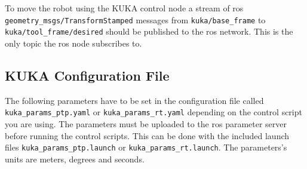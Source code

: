 \documentclass[headsepline,footinclude=false,fontsize=11pt,paper=a4,listof=totoc,bibliography=totoc,BCOR=12mm,DIV=14]{scrbook}
\begin{document}
To move the robot using the KUKA control node a stream of \gls{ros} \texttt{geometry\_msgs/TransformStamped} messages from \texttt{kuka/base\_frame} to \texttt{kuka/tool\_frame/desired} should be published to the \gls{ros} network. This is the only topic the \gls{ros} node subscribes to.

\newpage
\subsection{KUKA Configuration File}

The following parameters have to be set in the configuration file called \texttt{kuka\_params\_ptp.yaml} or \texttt{kuka\_params\_rt.yaml} depending on the control script you are using. The parameters must be uploaded to the \gls{ros} parameter server before running the control scripts. This can be done with the included launch files \texttt{kuka\_params\_ptp.launch} or \texttt{kuka\_params\_rt.launch}. The parameters's units are meters, degrees and seconds. 
\end{document}

